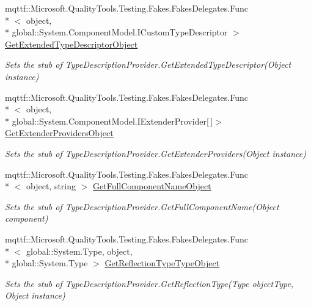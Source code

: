 \begin{DoxyCompactItemize}
mqttf\-::\-Microsoft.\-Quality\-Tools.\-Testing.\-Fakes.\-Fakes\-Delegates.\-Func\\*
$<$ object, \\*
global\-::\-System.\-Component\-Model.\-I\-Custom\-Type\-Descriptor $>$ \hyperlink{class_system_1_1_component_model_1_1_fakes_1_1_stub_type_description_provider_a23cc8cdb7e5878029c16538be30037af}{Get\-Extended\-Type\-Descriptor\-Object}
\begin{DoxyCompactList}\small\item\em Sets the stub of Type\-Description\-Provider.\-Get\-Extended\-Type\-Descriptor(\-Object instance)\end{DoxyCompactList}\item 
mqttf\-::\-Microsoft.\-Quality\-Tools.\-Testing.\-Fakes.\-Fakes\-Delegates.\-Func\\*
$<$ object, \\*
global\-::\-System.\-Component\-Model.\-I\-Extender\-Provider\mbox{[}$\,$\mbox{]}$>$ \hyperlink{class_system_1_1_component_model_1_1_fakes_1_1_stub_type_description_provider_a1b54cdafc4aa99cd758ae1faa5179839}{Get\-Extender\-Providers\-Object}
\begin{DoxyCompactList}\small\item\em Sets the stub of Type\-Description\-Provider.\-Get\-Extender\-Providers(\-Object instance)\end{DoxyCompactList}\item 
mqttf\-::\-Microsoft.\-Quality\-Tools.\-Testing.\-Fakes.\-Fakes\-Delegates.\-Func\\*
$<$ object, string $>$ \hyperlink{class_system_1_1_component_model_1_1_fakes_1_1_stub_type_description_provider_a1c419565a320a5ff36751fa9bf1b18f0}{Get\-Full\-Component\-Name\-Object}
\begin{DoxyCompactList}\small\item\em Sets the stub of Type\-Description\-Provider.\-Get\-Full\-Component\-Name(\-Object component)\end{DoxyCompactList}\item 
mqttf\-::\-Microsoft.\-Quality\-Tools.\-Testing.\-Fakes.\-Fakes\-Delegates.\-Func\\*
$<$ global\-::\-System.\-Type, object, \\*
global\-::\-System.\-Type $>$ \hyperlink{class_system_1_1_component_model_1_1_fakes_1_1_stub_type_description_provider_a9eeedc3f7128ee146abeda81f62dc8dc}{Get\-Reflection\-Type\-Type\-Object}
\begin{DoxyCompactList}\small\item\em Sets the stub of Type\-Description\-Provider.\-Get\-Reflection\-Type(\-Type object\-Type, Object instance)\end{DoxyCompactList}\item 

\end{DoxyCompactItemize}
